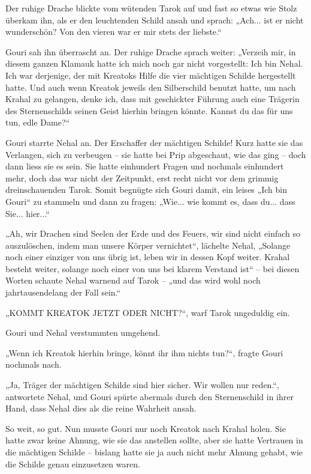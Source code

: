 Der ruhige Drache blickte vom wütenden Tarok auf und fast so etwas wie Stolz überkam ihn, als er den leuchtenden Schild ansah und sprach: „Ach... ist er nicht wunderschön? Von den vieren war er mir stets der liebste.“

 Gouri sah ihn überrascht an. Der ruhige Drache sprach weiter: „Verzeih mir, in diesem ganzen Klamauk hatte ich mich noch gar nicht vorgestellt: Ich bin Nehal. Ich war derjenige, der mit Kreatoks Hilfe die vier mächtigen Schilde hergestellt hatte. Und auch wenn Kreatok jeweils den Silberschild benutzt hatte, um nach Krahal zu gelangen, denke ich, dass mit geschickter Führung auch eine Trägerin des Sternenschilds seinen Geist hierhin bringen könnte. Kannst du das für uns tun, edle Dame?“

Gouri starrte Nehal an. Der Erschaffer der mächtigen Schilde! Kurz hatte sie das Verlangen, sich zu verbeugen – sie hatte bei Prip abgeschaut, wie das ging – doch dann liess sie es sein. Sie hatte einhundert Fragen und nochmals einhundert mehr, doch das war nicht der Zeitpunkt, erst recht nicht vor dem grimmig dreinschauenden Tarok. Somit begnügte sich Gouri damit, ein leises „Ich bin Gouri“ zu stammeln und dann zu fragen: „Wie... wie kommt es, dass du... dass Sie... hier...“

„Ah, wir Drachen sind Seelen der Erde und des Feuers, wir sind nicht einfach so auszulöschen, indem man unsere Körper vernichtet“, lächelte Nehal, „Solange noch einer einziger von uns übrig ist, leben wir in dessen Kopf weiter. Krahal besteht weiter, solange noch einer von uns bei klarem Verstand ist“ – bei diesen Worten schaute Nehal warnend auf Tarok – „und das wird wohl noch jahrtausendelang der Fall sein.“

„KOMMT KREATOK JETZT ODER NICHT?“, warf Tarok ungeduldig ein.

Gouri und Nehal verstummten umgehend.

„Wenn ich Kreatok hierhin bringe, könnt ihr ihm nichts tun?“, fragte Gouri nochmals nach.

„Ja, Träger der mächtigen Schilde sind hier sicher. Wir wollen nur reden.“, antwortete Nehal, und Gouri spürte abermals durch den Sternenschild in ihrer Hand, dass Nehal dies als die reine Wahrheit ansah.

So weit, so gut. Nun musste Gouri nur noch Kreatok nach Krahal holen. Sie hatte zwar keine Ahnung, wie sie das anstellen sollte, aber sie hatte Vertrauen in die mächtigen Schilde – bislang hatte sie ja auch nicht mehr Ahnung gehabt, wie die Schilde genau einzusetzen waren.

